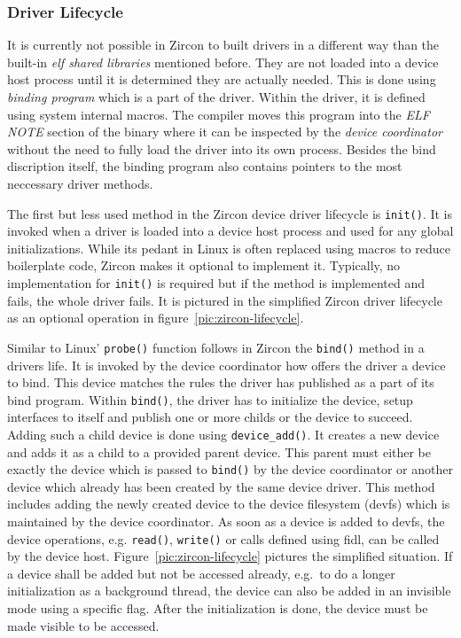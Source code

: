 \subsubsection*{Driver Lifecycle}\label{sec:zirconlifecycle}
It is currently not possible in Zircon to built drivers in a different way than the built-in \textit{\ac{elf} shared libraries} mentioned before.
They are not loaded into a device host process until it is determined they are actually needed.
This is done using \textit{binding program} which is a part of the driver.
Within the driver, it is defined using system internal macros.
The compiler moves this program into the \textit{ELF NOTE} section of the binary where it can be inspected by the \textit{device coordinator} without the need to fully load the driver into its own process.
Besides the bind discription itself, the binding program also contains pointers to the most neccessary driver methods\cite{zircon-devicemodel}.

The first but less used method in the Zircon device driver lifecycle is \texttt{init()}.
It is invoked when a driver is loaded into a device host process and used for any global initializations.
While its pedant in Linux is often replaced using macros to reduce boilerplate code, Zircon makes it optional to implement it.
Typically, no implementation for \texttt{init()} is required but if the method is implemented and fails, the whole driver fails\cite{zircon-devicemodel}.
It is pictured in the simplified Zircon driver lifecycle as an optional operation in figure~\ref{pic:zircon-lifecycle}.

Similar to Linux' \texttt{probe()} function follows in Zircon the \texttt{bind()} method in a drivers life.
It is invoked by the device coordinator how offers the driver a device to bind.
This device matches the rules the driver has published as a part of its bind program.
Within \texttt{bind()}, the driver has to initialize the device, setup interfaces to itself and publish one or more childs or the device to succeed\cite{zircon-ddk-gettingstarted}.
Adding such a child device is done using \texttt{device\_add()}.
It creates a new device and adds it as a child to a provided parent device.
This parent must either be exactly the device which is passed to \texttt{bind()} by the device coordinator or another device which already has been created by the same device driver.
This method includes adding the newly created device to the device filesystem (devfs) which is maintained by the device coordinator.
As soon as a device is added to devfs, the device operations, e.g. \texttt{read()}, \texttt{write()} or calls defined using \ac{fidl}, can be called by the device host.
Figure~\ref{pic:zircon-lifecycle} pictures the simplified situation.
If a device shall be added but not be accessed already, e.g.\ to do a longer initialization as a background thread, the device can also be added in an invisible mode using a specific flag.
After the initialization is done, the device must be made visible to be accessed\cite{zircon-devicemodel}.

